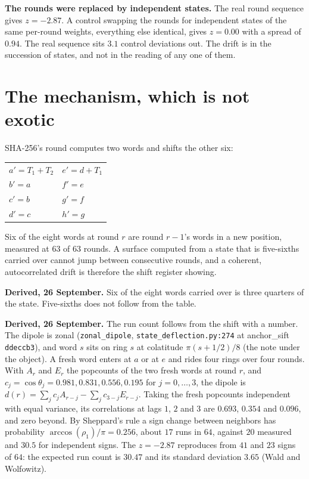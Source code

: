 \textbf{The rounds were replaced by independent states.} The real round sequence gives \(z = -2.87\). A control swapping the rounds for independent states of the same per-round weights, everything else identical, gives \(z = 0.00\) with a spread of \(0.94\). The real sequence sits \(3.1\) control deviations out. The drift is in the succession of states, and not in the reading of any one of them.

\section{The mechanism, which is not exotic}

SHA-256's round computes two words and shifts the other six:

\begin{center}
\begin{tabular}{@{}ll@{}}
\toprule
\(a' = T_1 + T_2\) & \(e' = d + T_1\) \\
\(b' = a\) & \(f' = e\) \\
\(c' = b\) & \(g' = f\) \\
\(d' = c\) & \(h' = g\) \\
\bottomrule
\end{tabular}
\end{center}

Six of the eight words at round \(r\) are round \(r-1\)'s words in a new position, measured at \(63\) of \(63\) rounds. A surface computed from a state that is five-sixths carried over cannot jump between consecutive rounds, and a coherent, autocorrelated drift is therefore the shift register showing.

\textbf{Derived, 26 September.} Six of the eight words carried over is three quarters of the state. Five-sixths does not follow from the table.

\textbf{Derived, 26 September.} The run count follows from the shift with a number. The dipole is zonal (\texttt{zonal\_dipole}, \texttt{state\_deflection.py:274} at anchor\_sift \texttt{ddeccb3}), and word \(s\) sits on ring \(s\) at colatitude \(\pi(s + 1/2)/8\) (the note under the object). A fresh word enters at \(a\) or at \(e\) and rides four rings over four rounds. With \(A_r\) and \(E_r\) the popcounts of the two fresh words at round \(r\), and \(c_j = \cos\theta_j = 0.981, 0.831, 0.556, 0.195\) for \(j = 0, \dots, 3\), the dipole is \(d(r) = \sum_j c_j A_{r-j} - \sum_j c_{3-j} E_{r-j}\). Taking the fresh popcounts independent with equal variance, its correlations at lags \(1\), \(2\) and \(3\) are \(0.693\), \(0.354\) and \(0.096\), and zero beyond. By Sheppard's rule a sign change between neighbors has probability \(\arccos(\rho_1)/\pi = 0.256\), about \(17\) runs in \(64\), against \(20\) measured and \(30.5\) for independent signs. The \(z = -2.87\) reproduces from \(41\) and \(23\) signs of \(64\): the expected run count is \(30.47\) and its standard deviation \(3.65\) (Wald and Wolfowitz).

